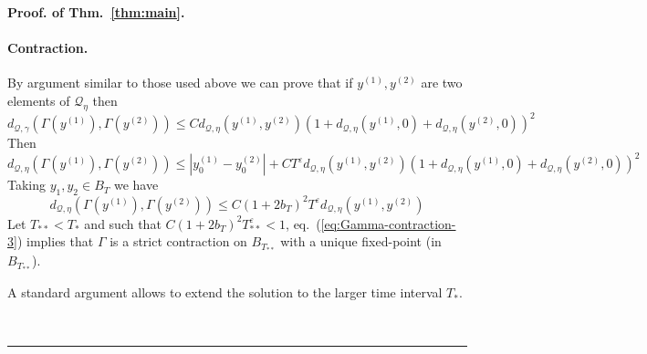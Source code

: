 \documentclass[a4paper,11pt,reqno]{article}
\newcommand{\eps}{\varepsilon}
\newcommand{\QQ}{\mathcal{Q}}
\newenvironment{proof}[1][Proof]{\textbf{#1.} }{\ \rule{0.5em}{0.5em}}
\begin{document}
\begin{proof}[Proof. of Thm.~\ref{thm:main}]
\paragraph{Contraction.}
By argument similar to those used above we can prove that if $y^{(1)},
y^{(2)}$ are two elements of $\QQ_{\eta}$ then
\begin{equation}
  \label{eq:Gamma-contraction}
  d_{\QQ,\gamma}(\Gamma(y^{(1)}),\Gamma(y^{(2)})) \le C d_{\QQ,\eta}(y^{(1)},y^{(2)}) (1+d_{\QQ,\eta}(y^{(1)},0)+d_{\QQ,\eta}(y^{(2)},0))^2 
\end{equation}
Then 
\begin{equation}
  \label{eq:Gamma-contraction-2}
   d_{\QQ,\eta}(\Gamma(y^{(1)}),\Gamma(y^{(2)})) \le
  |y^{(1)}_0-y^{(2)}_0| 
  + C T^\eps  d_{\QQ,\eta}(y^{(1)},y^{(2)}) (1+ d_{\QQ,\eta}(y^{(1)},0)+ d_{\QQ,\eta}(y^{(2)},0))^2 
\end{equation}
Taking $y_1,y_2 \in B_T$ we have
\begin{equation}
  \label{eq:Gamma-contraction-3}
  d_{\QQ,\eta}(\Gamma(y^{(1)}),\Gamma(y^{(2)})) \le
   C (1+2 b_T)^2 T^\eps d_{\QQ,\eta}(y^{(1)},y^{(2)})
\end{equation}
Let $T_{**} < T_*$ and such that  $C (1+2 b_T)^2 T_{**}^\eps < 1$, eq.~(\ref{eq:Gamma-contraction-3}) implies that
$\Gamma$ is a strict contraction on $B_{T_{**}}$ with a unique fixed-point
(in $B_{T_{**}}$).

A standard argument allows to extend the solution 
to the larger time interval $T_*$.


\end{proof}
\end{document}
